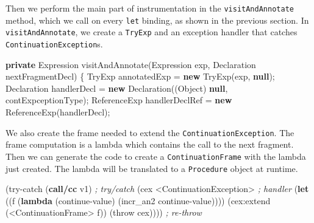 \documentclass[12pt,a4paper,oneside,openright]{book}
\newenvironment{Shaded}{\begin{snugshade}}{\end{snugshade}}
\newcommand{\KeywordTok}[1]{\textcolor[rgb]{0.13,0.29,0.53}{\textbf{{#1}}}}
\newcommand{\CommentTok}[1]{\textcolor[rgb]{0.56,0.35,0.01}{\textit{{#1}}}}
\newcommand{\FunctionTok}[1]{\textcolor[rgb]{0.00,0.00,0.00}{{#1}}}
\newcommand{\NormalTok}[1]{{#1}}
\begin{document}
Then we perform the main part of instrumentation in the
\texttt{visitAndAnnotate} method, which we call on every \texttt{let}
binding, as shown in the previous section. In \texttt{visitAndAnnotate},
we create a \texttt{TryExp} and an exception handler that catches
\texttt{ContinuationException}s.

\begin{Shaded}
\begin{Highlighting}[]
\KeywordTok{private} \NormalTok{Expression }\FunctionTok{visitAndAnnotate}\NormalTok{(Expression exp,}
                                    \NormalTok{Declaration nextFragmentDecl) \{}
    \NormalTok{TryExp annotatedExp = }\KeywordTok{new} \FunctionTok{TryExp}\NormalTok{(exp, }\KeywordTok{null}\NormalTok{);}
    \NormalTok{Declaration handlerDecl = }\KeywordTok{new} \FunctionTok{Declaration}\NormalTok{((Object) }\KeywordTok{null}\NormalTok{,}
                                              \NormalTok{contExpceptionType);}
    \NormalTok{ReferenceExp handlerDeclRef = }\KeywordTok{new} \FunctionTok{ReferenceExp}\NormalTok{(handlerDecl);}
\end{Highlighting}
\end{Shaded}

We also create the frame needed to extend the
\texttt{ContinuationException}. The frame computation is a lambda which
contains the call to the next fragment. Then we can generate the code to
create a \texttt{ContinuationFrame} with the lambda just created. The
lambda will be translated to a \texttt{Procedure} object at runtime.

\begin{Shaded}
\begin{Highlighting}[]
\NormalTok{(try-catch (}\KeywordTok{call/cc} \NormalTok{v1)             }\CommentTok{; try/catch}
  \NormalTok{(cex <ContinuationException>      }\CommentTok{; handler}
    \NormalTok{(}\KeywordTok{let} \NormalTok{((f (}\KeywordTok{lambda} \NormalTok{(continue-value)}
               \NormalTok{(incr_an2 continue-value))))}
      \NormalTok{(cex:extend (<ContinuationFrame> f))}
      \NormalTok{(throw cex))))                }\CommentTok{; re-throw}
\end{Highlighting}
\end{Shaded}
\end{document}
